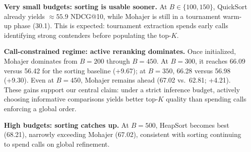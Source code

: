 \documentclass[11pt]{article}
\begin{document}
\noindent\textbf{Very small budgets: sorting is usable sooner.}
At $B\in\{100,150\}$, QuickSort already yields $\approx55.9$ NDCG@10, while Mohajer is still in a tournament warm-up phase (30.1). This is expected: tournament extraction spends early calls identifying strong contenders before populating the top-$K$.

\noindent\textbf{Call-constrained regime: active reranking dominates.}
Once initialized, Mohajer dominates from $B{=}200$ through $B{=}450$. At $B{=}300$, it reaches 66.09 versus 56.42 for the sorting baseline (+9.67); at $B{=}350$, 66.28 versus 56.98 (+9.30). Even at $B{=}450$, Mohajer remains ahead (67.02 vs.\ 62.81; +4.21). These gains support our central claim: under a strict inference budget, actively choosing informative comparisons yields better top-$K$ quality than spending calls enforcing a global order.


\noindent\textbf{High budgets: sorting catches up.}
At $B{=}500$, HeapSort becomes best (68.21), narrowly exceeding Mohajer (67.02), consistent with sorting continuing to spend calls on global refinement.




\end{document}
